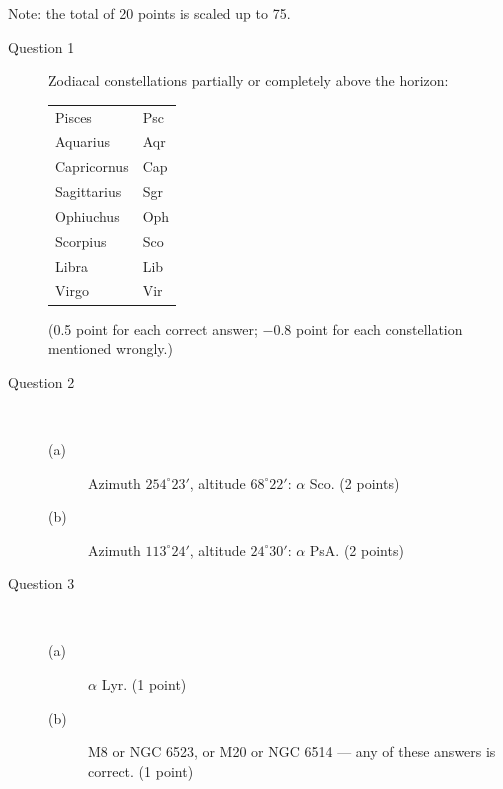 Note: the total of 20 points is scaled up to 75.

\begin{description}
\item[Question 1] Zodiacal constellations partially or completely above the
  horizon:

  \begin{center}
  \begin{tabular}{ll}
  Pisces & Psc \\
  Aquarius & Aqr \\
  Capricornus & Cap \\
  Sagittarius & Sgr \\
  Ophiuchus & Oph \\
  Scorpius & Sco \\
  Libra & Lib \\
  Virgo & Vir \\
  \end{tabular}
  \end{center}

  (0.5 point for each correct answer; $-0.8$ point for each constellation
  mentioned wrongly.)
\item[Question 2]~
  \begin{description}
  \item[(a)] Azimuth $254^\circ 23'$, altitude $68^\circ 22'$:
    $\alpha$ Sco. \hfill(2 points)
  \item[(b)] Azimuth $113^\circ 24'$, altitude $24^\circ 30'$:
    $\alpha$ PsA. \hfill(2 points)
  \end{description}
\item[Question 3]~
  \begin{description}
  \item[(a)] $\alpha$ Lyr. \hfill(1 point)
  \item[(b)] M8 or NGC 6523, or M20 or NGC 6514 --- any of these answers
    is correct. \hfill(1 point)
  \end{description}
\end{description}

